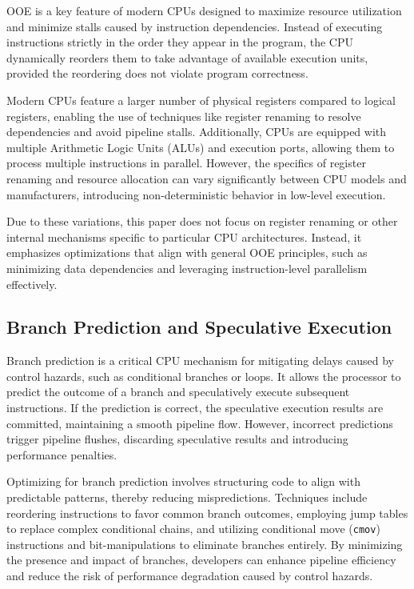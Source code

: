 \documentclass{article}
\begin{document}
OOE is a key feature of modern CPUs designed to maximize resource utilization and minimize stalls caused by instruction dependencies. Instead of executing instructions strictly in the order they appear in the program, the CPU dynamically reorders them to take advantage of available execution units, provided the reordering does not violate program correctness.

Modern CPUs feature a larger number of physical registers compared to logical registers, enabling the use of techniques like register renaming to resolve dependencies and avoid pipeline stalls. Additionally, CPUs are equipped with multiple Arithmetic Logic Units (ALUs) and execution ports, allowing them to process multiple instructions in parallel. However, the specifics of register renaming and resource allocation can vary significantly between CPU models and manufacturers, introducing non-deterministic behavior in low-level execution.

Due to these variations, this paper does not focus on register renaming or other internal mechanisms specific to particular CPU architectures. Instead, it emphasizes optimizations that align with general OOE principles, such as minimizing data dependencies and leveraging instruction-level parallelism effectively.

\subsection{Branch Prediction and Speculative Execution}

Branch prediction is a critical CPU mechanism for mitigating delays caused by control hazards, such as conditional branches or loops. It allows the processor to predict the outcome of a branch and speculatively execute subsequent instructions. If the prediction is correct, the speculative execution results are committed, maintaining a smooth pipeline flow. However, incorrect predictions trigger pipeline flushes, discarding speculative results and introducing performance penalties.

Optimizing for branch prediction involves structuring code to align with predictable patterns, thereby reducing mispredictions. Techniques include reordering instructions to favor common branch outcomes, employing jump tables to replace complex conditional chains, and utilizing conditional move (\texttt{cmov}) instructions and bit-manipulations to eliminate branches entirely. By minimizing the presence and impact of branches, developers can enhance pipeline efficiency and reduce the risk of performance degradation caused by control hazards.
\end{document}
